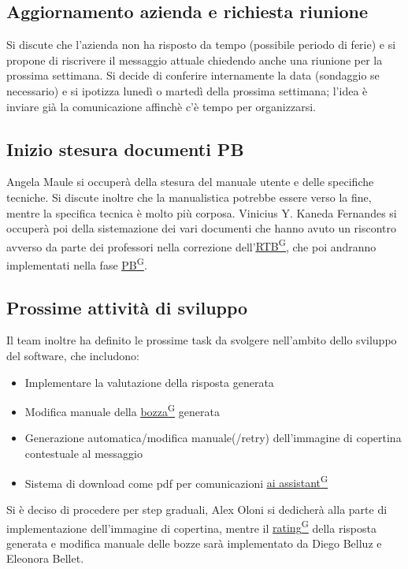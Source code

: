 \documentclass[a4paper,12pt]{article}
\providecommand{\glslink}[2]{\href{https://alittlebyte-19.github.io/Documentazione/glossario.html\#gls-#1}{\underline{#2}\textsuperscript{\scriptsize G}}}
\begin{document}
\subsection{Aggiornamento azienda e richiesta riunione}
Si discute che l’azienda non ha risposto da tempo (possibile periodo di ferie) e si propone di riscrivere il messaggio attuale chiedendo anche una riunione per la prossima settimana. Si decide di conferire internamente la data (sondaggio se necessario) e 
si ipotizza lunedì o martedì della prossima settimana; l’idea è inviare già la comunicazione affinchè c'è tempo per organizzarsi.

\subsection{Inizio stesura documenti PB}
Angela Maule si occuperà della stesura del manuale utente e delle specifiche tecniche. Si discute inoltre che
la manualistica potrebbe essere verso la fine, mentre la specifica tecnica è molto più corposa.
Vinicius Y. Kaneda Fernandes si occuperà poi della sistemazione dei vari documenti che hanno avuto un riscontro avverso da parte dei professori nella correzione dell'\glslink{rtb-requirements-and-technology-baseline}{RTB}, che poi andranno implementati nella fase \glslink{pb-product-baseline}{PB}.

\subsection{Prossime attività di sviluppo}
Il team inoltre ha definito le prossime task da svolgere nell'ambito dello sviluppo del software, che includono:
\begin{itemize}
\item Implementare la valutazione della risposta generata
\item Modifica manuale della \glslink{bozza-draft}{bozza} generata
\item Generazione automatica/modifica manuale(/retry) dell’immagine di copertina contestuale al messaggio
\item Sistema di download come pdf per comunicazioni \glslink{ai-assistant-generativo-ai-assistant}{ai assistant}
\end{itemize}
Si è deciso di procedere per step graduali, Alex Oloni si dedicherà alla parte di implementazione dell'immagine di copertina, mentre il \glslink{rating}{rating} della risposta generata e modifica manuale delle bozze sarà implementato da Diego Belluz e Eleonora Bellet.
\newpage
\end{document}

